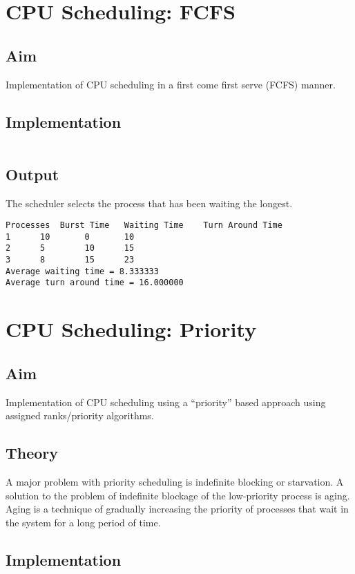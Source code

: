 \section{CPU Scheduling: FCFS}
\label{sec:cpu-scheduling}

\subsection{Aim}
Implementation of CPU scheduling in a first come first serve (FCFS) manner.

\subsection{Implementation}

\inputminted[fontsize=\footnotesize,autogobble]{c}{code/fcfs.c}

\subsection{Output}
The scheduler selects the process that has been waiting the longest.
\begin{lstlisting}[style=output]
Processes  Burst Time   Waiting Time    Turn Around Time
1	   10		0		10
2	   5		10		15
3	   8		15		23
Average waiting time = 8.333333
Average turn around time = 16.000000
\end{lstlisting}

\pagebreak
\section{CPU Scheduling: Priority}
\label{sec:cpu-scheduling-priority}

\subsection{Aim}
Implementation of CPU scheduling using a ``priority'' based approach using assigned ranks/priority algorithms.

\subsection{Theory}
A major problem with priority scheduling is indefinite blocking or starvation. A solution to the problem of indefinite blockage of the low-priority process is aging. Aging is a technique of gradually increasing the priority of processes that wait in the system for a long period of time.

\subsection{Implementation}

